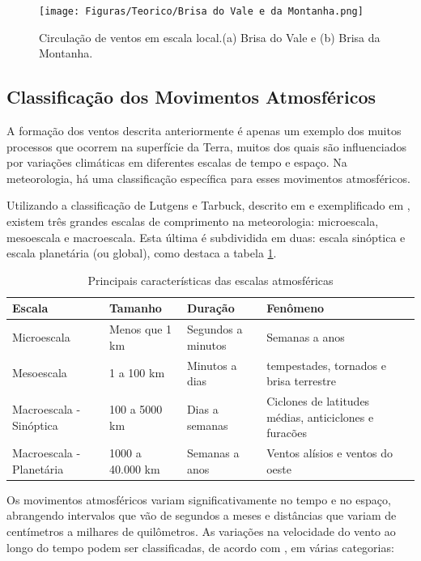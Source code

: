 \begin{figure}[H]
    \caption{Circulação de ventos em escala local.(a) Brisa do Vale e (b) Brisa da Montanha. }
    \label{fig:brisaValeMotanha}
    \centering
    \texttt{[image: Figuras/Teorico/Brisa do Vale e da Montanha.png]}
\end{figure}

 \subsection{Classificação dos Movimentos Atmosféricos}
\par A formação dos ventos descrita anteriormente é apenas um exemplo dos muitos processos que ocorrem na superfície da Terra, muitos dos quais são influenciados por variações climáticas em diferentes escalas de tempo e espaço. Na meteorologia, há uma classificação específica para esses movimentos atmosféricos.
\par Utilizando a classificação de Lutgens e Tarbuck, descrito em \cite{lutgens2012atmosphere} e exemplificado em \cite{pinto2014}, existem três grandes escalas de comprimento na meteorologia: microescala, mesoescala e macroescala. Esta última é subdividida em duas: escala sinóptica e escala planetária (ou global), como destaca a tabela \ref{tab:escalar-atmosféricas}.

\begin{table}[h]
\caption{Principais características das escalas atmosféricas}
\centering
\begin{tabularx}{\textwidth}{X|X|X|X}
\hline
\textbf{Escala} & \textbf{Tamanho} & \textbf{Duração} & \textbf{Fenômeno} \\
\hline
Microescala & Menos que 1 km & Segundos a minutos
 & Semanas a anos \\
\hline
Mesoescala & 1 a 100 km & Minutos a dias & tempestades, tornados e brisa terrestre \\
\hline
Macroescala - Sinóptica & 100 a 5000 km & Dias a semanas
 & Ciclones de latitudes médias, anticiclones e furacões \\
\hline
Macroescala - Planetária & 1000 a 40.000 km & Semanas a anos & Ventos alísios e ventos do oeste \\
\hline
\end{tabularx}

\label{tab:escalar-atmosféricas}
\end{table}

\par Os movimentos atmosféricos variam significativamente no tempo e no espaço, abrangendo intervalos que vão de segundos a meses e distâncias que variam de centímetros a milhares de quilômetros. As variações na velocidade do vento ao longo do tempo podem ser classificadas, de acordo com \cite{pinto2014}, em várias categorias:


